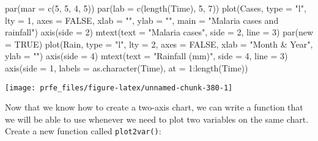 \documentclass[
  12pt,
  a4paper]{book}
\newenvironment{Shaded}{\begin{snugshade}}{\end{snugshade}}
\newcommand{\AttributeTok}[1]{\textcolor[rgb]{0.77,0.63,0.00}{#1}}
\newcommand{\ConstantTok}[1]{\textcolor[rgb]{0.00,0.00,0.00}{#1}}
\newcommand{\DecValTok}[1]{\textcolor[rgb]{0.00,0.00,0.81}{#1}}
\newcommand{\FunctionTok}[1]{\textcolor[rgb]{0.00,0.00,0.00}{#1}}
\newcommand{\NormalTok}[1]{#1}
\newcommand{\SpecialCharTok}[1]{\textcolor[rgb]{0.00,0.00,0.00}{#1}}
\newcommand{\StringTok}[1]{\textcolor[rgb]{0.31,0.60,0.02}{#1}}
\begin{document}
\begin{Shaded}
\begin{Highlighting}[]
\FunctionTok{par}\NormalTok{(}\AttributeTok{mar =} \FunctionTok{c}\NormalTok{(}\DecValTok{5}\NormalTok{, }\DecValTok{5}\NormalTok{, }\DecValTok{4}\NormalTok{, }\DecValTok{5}\NormalTok{))}
\FunctionTok{par}\NormalTok{(}\AttributeTok{lab =} \FunctionTok{c}\NormalTok{(}\FunctionTok{length}\NormalTok{(Time), }\DecValTok{5}\NormalTok{, }\DecValTok{7}\NormalTok{))}
\FunctionTok{plot}\NormalTok{(Cases, }\AttributeTok{type =} \StringTok{"l"}\NormalTok{, }\AttributeTok{lty =} \DecValTok{1}\NormalTok{, }\AttributeTok{axes =} \ConstantTok{FALSE}\NormalTok{,}
     \AttributeTok{xlab =} \StringTok{""}\NormalTok{, }\AttributeTok{ylab =} \StringTok{""}\NormalTok{, }\AttributeTok{main =} \StringTok{"Malaria cases and rainfall"}\NormalTok{)}
\FunctionTok{axis}\NormalTok{(}\AttributeTok{side =} \DecValTok{2}\NormalTok{)}
\FunctionTok{mtext}\NormalTok{(}\AttributeTok{text =} \StringTok{"Malaria cases"}\NormalTok{, }\AttributeTok{side =} \DecValTok{2}\NormalTok{, }\AttributeTok{line =} \DecValTok{3}\NormalTok{)}
\FunctionTok{par}\NormalTok{(}\AttributeTok{new =} \ConstantTok{TRUE}\NormalTok{)}
\FunctionTok{plot}\NormalTok{(Rain, }\AttributeTok{type =} \StringTok{"l"}\NormalTok{, }\AttributeTok{lty =} \DecValTok{2}\NormalTok{, }\AttributeTok{axes =} \ConstantTok{FALSE}\NormalTok{,}
     \AttributeTok{xlab =} \StringTok{"Month \& Year"}\NormalTok{, }\AttributeTok{ylab =} \StringTok{""}\NormalTok{)}
\FunctionTok{axis}\NormalTok{(}\AttributeTok{side =} \DecValTok{4}\NormalTok{)}
\FunctionTok{mtext}\NormalTok{(}\AttributeTok{text =} \StringTok{"Rainfall (mm)"}\NormalTok{, }\AttributeTok{side =} \DecValTok{4}\NormalTok{, }\AttributeTok{line =} \DecValTok{3}\NormalTok{)}
\FunctionTok{axis}\NormalTok{(}\AttributeTok{side =} \DecValTok{1}\NormalTok{, }\AttributeTok{labels =} \FunctionTok{as.character}\NormalTok{(Time), }\AttributeTok{at =} \DecValTok{1}\SpecialCharTok{:}\FunctionTok{length}\NormalTok{(Time))}
\end{Highlighting}
\end{Shaded}

\begin{center}\texttt{[image: prfe\_files/figure-latex/unnamed-chunk-380-1]} \end{center}

\newpage

Now that we know how to create a two-axis chart, we can write a function that we will be able to use whenever we need to plot two variables on the same chart. Create a new function called \texttt{plot2var()}:
\end{document}
